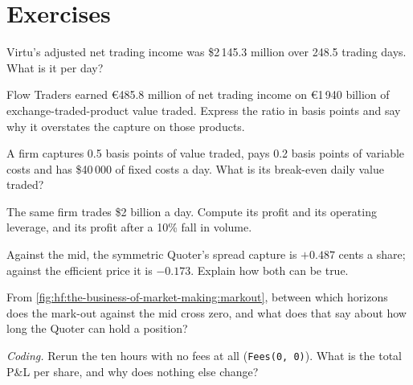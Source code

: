 \section{Exercises}

\begin{exercise}[$\star$]\label{exo:hf:the-business-of-market-making:1}
Virtu's adjusted net trading income was \$2\,145.3 million over 248.5 trading days. What is it per day?
\end{exercise}

\begin{exercise}[$\star$]\label{exo:hf:the-business-of-market-making:2}
Flow Traders earned \euro485.8 million of net trading income on \euro1\,940 billion of exchange-traded-product value traded. Express the ratio in basis
points and say why it overstates the capture on those products.
\end{exercise}

\begin{exercise}[$\star$]\label{exo:hf:the-business-of-market-making:3}
A firm captures 0.5 basis points of value traded, pays 0.2 basis points of variable costs and has \$40\,000 of fixed costs a day. What is its
break-even daily value traded?
\end{exercise}

\begin{exercise}[$\star\star$]\label{exo:hf:the-business-of-market-making:4}
The same firm trades \$2 billion a day. Compute its profit and its operating leverage, and its profit after a 10\% fall in volume.
\end{exercise}

\begin{exercise}[$\star\star$]\label{exo:hf:the-business-of-market-making:5}
Against the mid, the symmetric Quoter's spread capture is $+0.487$ cents a share; against the efficient price it is $-0.173$. Explain how both can
be true.
\end{exercise}

\begin{exercise}[$\star\star$]\label{exo:hf:the-business-of-market-making:6}
From \cref{fig:hf:the-business-of-market-making:markout}, between which horizons does the mark-out against the mid cross zero, and what does that
say about how long the Quoter can hold a position?
\end{exercise}

\begin{exercise}[$\star\star\star$]\label{exo:hf:the-business-of-market-making:7}
\emph{Coding.} Rerun the ten hours with no fees at all (\texttt{Fees(0, 0)}). What is the total P\&L per share, and why does nothing else change?
\end{exercise}

